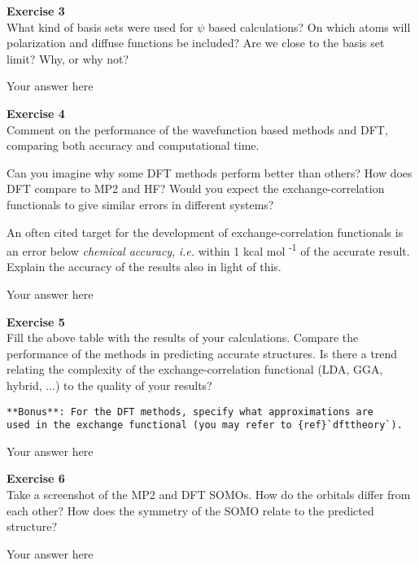 \documentclass{article}
\begin{document}
\begin{mdframed}
\textbf{Exercise 3}\\
What kind of basis sets were used for $\psi$ based calculations? On which atoms will polarization and diffuse functions be included? Are we close to the basis set limit? Why, or why not?
\end{mdframed}

Your answer here

\begin{mdframed}
\textbf{Exercise 4}\\
Comment on the performance of the wavefunction based methods and DFT, comparing both accuracy and computational time.

Can you imagine why some DFT methods perform better than others? How does DFT compare to MP2 and HF?
Would you expect the exchange-correlation functionals to give similar errors in different systems?

An often cited target for the development of exchange-correlation functionals is an error below \textit{chemical accuracy}, \textit{i.e.} within 1
kcal mol \textsuperscript{-1} of the accurate result. Explain the accuracy of the results also in light of this.
\end{mdframed}

Your answer here

\begin{mdframed}
\textbf{Exercise 5}\\
Fill the above table with the results of your calculations. Compare the performance of the methods in predicting accurate
structures.     Is there a trend relating the complexity of the exchange-correlation functional (LDA, GGA, hybrid, ...) to the quality of your results?

\begin{verbatim}
**Bonus**: For the DFT methods, specify what approximations are
used in the exchange functional (you may refer to {ref}`dfttheory`).
\end{verbatim}
\end{mdframed}

Your answer here

\begin{mdframed}
\textbf{Exercise 6}\\
Take a screenshot of the MP2 and DFT SOMOs. How do the orbitals differ from each other? How does the symmetry of the SOMO relate to the predicted structure?
\end{mdframed}

Your answer here
\end{document}
